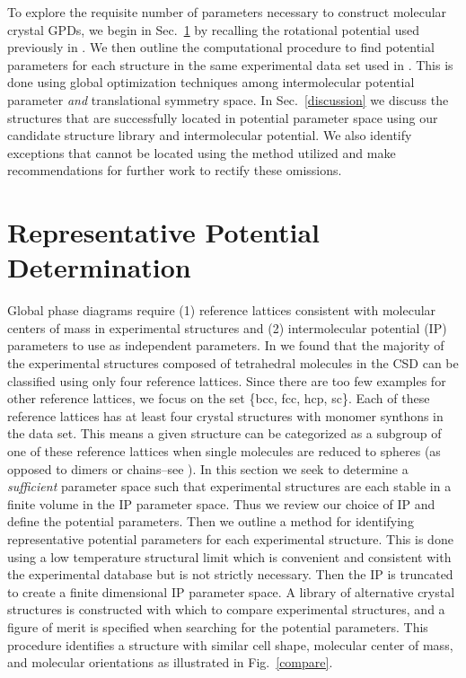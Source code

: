 \documentclass[preprint]{iucr}              %
\begin{document}
To explore the requisite number of parameters necessary to construct molecular
crystal GPDs, we begin in Sec.~\ref{method} by recalling the rotational
potential used previously in \cite{Mettes04}.  We then outline the computational
procedure to find potential parameters for each structure in the same
experimental data set used in \cite{McClurg09}. This is done using global
optimization techniques among intermolecular potential parameter
\emph{and} translational symmetry space. In Sec.~\ref{discussion} we discuss the
structures that are successfully located in potential parameter space using our
candidate structure library and intermolecular potential.  We also identify
exceptions that cannot be located using the method utilized and make
recommendations for further work to rectify these omissions.


\section{Representative Potential Determination}
\label{method}

Global phase diagrams require (1) reference lattices consistent with
molecular centers of mass in experimental structures and (2)
intermolecular potential (IP) parameters to use as independent
parameters. In \cite{McClurg09} we found that the majority of the
experimental structures composed of tetrahedral molecules in the CSD can be
classified using only four reference lattices. Since there are too few examples
for other reference lattices, we focus on the set \{bcc, fcc,
hcp, sc\}. Each of these reference lattices has at least four crystal
structures with monomer synthons in the data set.  This means a given structure
can be categorized as a subgroup of one of these reference lattices when single
molecules are reduced to spheres (as opposed to dimers or chains--see
\cite{McClurg09}).  In this section we seek to determine a \emph{sufficient}
parameter space such that experimental
structures are each stable in a finite volume in the IP parameter space. Thus we
review
our choice of IP and define the potential parameters.  Then we
outline a method for identifying representative potential parameters
for each experimental structure. This is done using a low
temperature structural limit which is convenient and consistent with the
experimental database but is not strictly necessary.  Then
the IP is truncated to create a finite dimensional IP parameter
space.  A library of alternative crystal structures is constructed
with which to compare experimental structures, and a figure of merit
is specified when searching for the potential parameters. This
procedure identifies a structure with similar cell shape, molecular
center of mass, and molecular orientations as illustrated in
Fig.~\ref{compare}.
\end{document}
